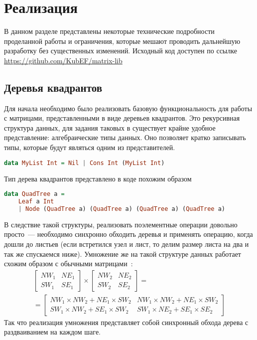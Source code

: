 
\section{Реализация}
В данном разделе представлены некоторые технические подробности проделанной работы и ограничения, которые мешают проводить дальнейшую разработку без существенных изменений. Исходный код доступен по ссылке \url{https://github.com/KubEF/matrix-lib}
\subsection{Деревья квадрантов}
Для начала необходимо было реализовать базовую функциональность для работы с матрицами, представленными в виде деревьев квадрантов. Это рекурсивная структура данных, для задания таковых в \Haskell{} существует крайне удобное представление: алгебраические типы данных. Оно позволяет кратко записывать типы, которые будут являться одним из представителей.
\begin{lstlisting}[caption={пример конструирования односвязного списка над целыми числами}, language=Haskell, frame=single]
    data MyList Int = Nil | Cons Int (MyList Int)
\end{lstlisting}
Тип дерева квадрантов представлено в коде похожим образом
\begin{lstlisting}[caption={задание типа дерева квадрантов в библоитеке}, language=Haskell, frame=single, basicstyle=\ttfamily]
data QuadTree a =
    Leaf a Int
    | Node (QuadTree a) (QuadTree a) (QuadTree a) (QuadTree a)
\end{lstlisting}
В следствие такой структуры, реализовать поэлементные операции довольно просто~--- необходимо синхронно обходить деревья и применять операцию, когда дошли до листьев (если встретился узел и лист, то делим размер листа на два и так же спускаемся ниже). Умножение же на такой структуре данных работает схожим образом с обычными матрицами~\cite{10.1007/3-540-51084-2_9}:
\begin{gather*}
    \begin{bmatrix}
        NW_1 & NE_1 \\
        SW_1 & SE_1
    \end{bmatrix}
    \times
    \begin{bmatrix}
        NW_2 & NE_2 \\
        SW_2 & SE_2
    \end{bmatrix} = \\ =
    \begin{bmatrix}
        NW_1 \times NW_2 + NE_1 \times SW_2 & NW_1 \times NW_2 + NE_1 \times SW_2  \\
        SW_1 \times NW_2 + SE_1 \times SW_2 & SW_1 \times NE_2 + SE_1 \times SE_2
    \end{bmatrix}
\end{gather*}
Так что реализация умножения представляет собой синхронный обхода дерева с раздваиванием на каждом шаге.
